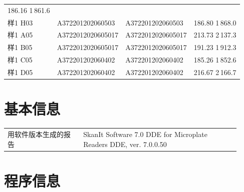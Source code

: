 \documentclass[UTF8,10pt,a4paper,fontset=fandol]{ctexart}
\newcommand{\fieldvalue}[1]{#1}
\begin{document}
\begin{tabular}{@{}llll@{}}
\fieldvalue{186.16}
\quad
\fieldvalue{1\,861.6}\\
样1 H03 & A372201202060503 &
\fieldvalue{A372201202060503} &
\fieldvalue{186.80}
\quad
\fieldvalue{1\,868.0}\\
样1 A05 & A3722012020605017 &
\fieldvalue{A3722012020605017} &
\fieldvalue{213.73}
\quad
\fieldvalue{2\,137.3}\\
样1 B05 & A3722012020605017 &
\fieldvalue{A3722012020605017} &
\fieldvalue{191.23}
\quad
\fieldvalue{1\,912.3}\\
样1 C05 & A372201202060402 &
\fieldvalue{A372201202060402} &
\fieldvalue{185.26}
\quad
\fieldvalue{1\,852.6}\\
样1 D05 & A372201202060402 &
\fieldvalue{A372201202060402} &
\fieldvalue{216.67}
\quad
\fieldvalue{2\,166.7}
\end{tabular}

\section*{基本信息}

\begin{tabular}{@{}p{0.30\linewidth}p{0.62\linewidth}@{}}
用软件版本生成的报告 &
\fieldvalue{SkanIt Software 7.0 DDE for Microplate Readers DDE, ver. 7.0.0.50}
\end{tabular}

\section*{程序信息}
\end{document}
